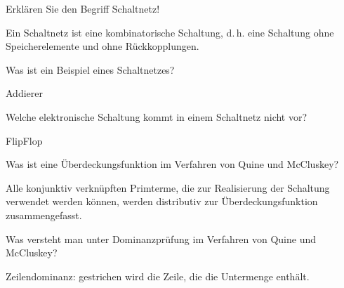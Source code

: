 \documentclass
[
  draft    = true,
  fontsize = 11pt,
  parskip  = half-,
  BCOR     = 0pt,
  DIV      = 11,
  ngerman,
  dvipsnames
]
{scrartcl}
\begin{document}
\begin{mytemize}
  \item Erklären Sie den Begriff Schaltnetz!
        \begin{achim}
          \begin{mytemize}
            \item Ein Schaltnetz ist eine kombinatorische Schaltung, d.\,h.
                  eine Schaltung ohne Speicherelemente und ohne Rückkopplungen.
          \end{mytemize}
        \end{achim}
        \begin{mytemize}
          \item Was ist ein Beispiel eines Schaltnetzes?
                \begin{achim}
                  \begin{mytemize}
                    \item Addierer
                  \end{mytemize}
                \end{achim}
          \item Welche elektronische Schaltung kommt in einem Schaltnetz nicht vor?
                \begin{achim}
                  \begin{mytemize}
                    \item FlipFlop
                  \end{mytemize}
                \end{achim}
        \end{mytemize}
  \item Was ist eine Überdeckungsfunktion im Verfahren von Quine und McCluskey?
        \begin{achim}
          \begin{mytemize}
            \item Alle konjunktiv verknüpften Primterme, die zur
                  Realisierung der Schaltung verwendet werden können, werden
                  distributiv zur Überdeckungsfunktion zusammengefasst.
          \end{mytemize}
        \end{achim}
  \item Was versteht man unter Dominanzprüfung im Verfahren von Quine und McCluskey?
        \begin{achim}
          \begin{mytemize}
            \item Zeilendominanz: gestrichen wird die Zeile, die die Untermenge enthält.

\end{mytemize}
\end{achim}
\end{mytemize}
\end{document}
